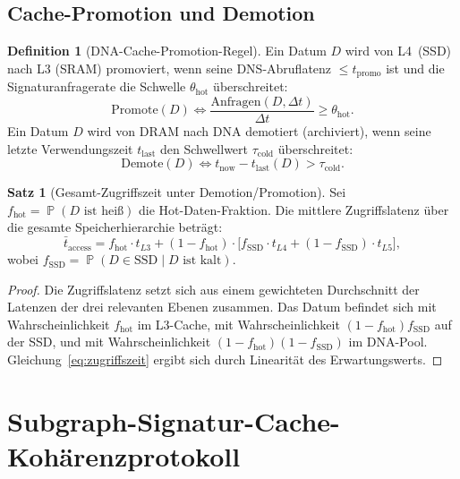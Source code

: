 ﻿\documentclass[a4paper,12pt]{article}
\theoremstyle{definition}
\newtheorem{definition}{Definition}[section]
\newtheorem{satz}{Satz}[section]
\DeclareMathOperator{\Prob}{\mathbb{P}}
\begin{document}
\subsection{Cache-Promotion und Demotion}

\begin{definition}[DNA-Cache-Promotion-Regel]
  \label{def:promotion}
  Ein Datum $D$ wird von L4~(SSD) nach L3 (SRAM) promoviert, wenn
  seine DNS-Abruflatenz $\le t_{\mathrm{promo}}$ ist und die
  Signaturanfragerate die Schwelle $\theta_{\mathrm{hot}}$ überschreitet:
  \[
    \mathrm{Promote}(D) \iff
    \frac{\mathrm{Anfragen}(D, \Delta t)}{\Delta t} \ge \theta_{\mathrm{hot}}.
  \]
  Ein Datum $D$ wird von DRAM nach DNA demotiert (archiviert), wenn
  seine letzte Verwendungszeit $t_{\mathrm{last}}$ den Schwellwert
  $\tau_{\mathrm{cold}}$ überschreitet:
  \[
    \mathrm{Demote}(D) \iff t_{\mathrm{now}} - t_{\mathrm{last}}(D) > \tau_{\mathrm{cold}}.
  \]
\end{definition}

\begin{satz}[Gesamt-Zugriffszeit unter Demotion/Promotion]
  \label{satz:zugriffszeit}
  Sei $f_{\mathrm{hot}} = \Prob(D \text{ ist heiß})$ die
  Hot-Daten-Fraktion. Die mittlere Zugriffslatenz über die gesamte
  Speicherhierarchie beträgt:
  \begin{equation}
    \bar{t}_{\mathrm{access}} = f_{\mathrm{hot}} \cdot t_{L3}
    + (1 - f_{\mathrm{hot}}) \cdot \bigl[f_{\mathrm{SSD}} \cdot t_{L4}
    + (1 - f_{\mathrm{SSD}}) \cdot t_{L5}\bigr],
    \label{eq:zugriffszeit}
  \end{equation}
  wobei $f_{\mathrm{SSD}} = \Prob(D \in \mathrm{SSD} \mid D \text{ ist kalt})$.
\end{satz}

\begin{proof}
  Die Zugriffslatenz setzt sich aus einem gewichteten Durchschnitt der
  Latenzen der drei relevanten Ebenen zusammen. Das Datum befindet sich
  mit Wahrscheinlichkeit $f_{\mathrm{hot}}$ im L3-Cache,
  mit Wahrscheinlichkeit $(1-f_{\mathrm{hot}}) f_{\mathrm{SSD}}$ auf der SSD,
  und mit Wahrscheinlichkeit $(1-f_{\mathrm{hot}})(1-f_{\mathrm{SSD}})$ im DNA-Pool.
  Gleichung~\eqref{eq:zugriffszeit} ergibt sich durch Linearität des Erwartungswerts.
\end{proof}

\section{Subgraph-Signatur-Cache-Kohärenzprotokoll}
\end{document}
